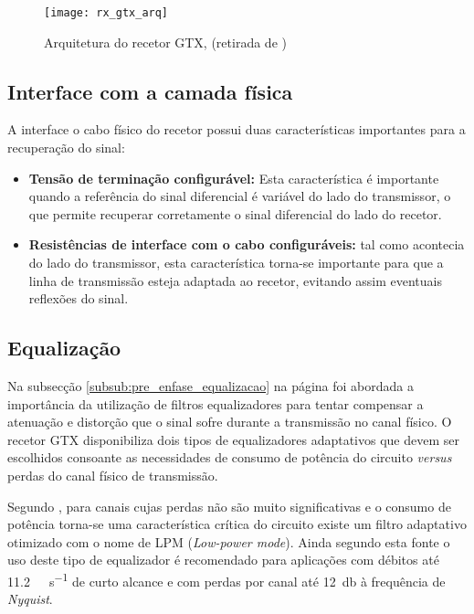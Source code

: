 \begin{figure}[h!]
	\begin{center}
		\leavevmode
		\texttt{[image: rx\_gtx\_arq]}
		\centering
		\caption[Arquitetura do recetor GTX]{Arquitetura do recetor GTX, (retirada de \cite{R011})}
		\label{fig:gtx_rx_arq}
	\end{center}
\end{figure}
	

\subsection{Interface com a camada física}

A interface o cabo físico do recetor possui duas características importantes para a recuperação do sinal:
\begin{itemize}
	\item \textbf{Tensão de terminação configurável:} Esta característica é importante quando a referência do sinal diferencial é variável do lado do transmissor, o que permite recuperar corretamente o sinal diferencial do lado do recetor.
	
	\item \textbf{Resistências de interface com o cabo configuráveis:} tal como acontecia do lado do transmissor, esta característica torna-se importante para que a linha de transmissão esteja adaptada ao recetor, evitando assim eventuais reflexões do sinal.
\end{itemize}


\subsection{Equalização} \label{subsub:rx_equalização}

Na subsecção \ref{subsub:pre_enfase_equalizacao} na página \pageref{subsub:pre_enfase_equalizacao} foi abordada a importância da utilização de filtros equalizadores para tentar compensar a atenuação e distorção que o sinal sofre durante a transmissão no canal físico. O recetor GTX disponibiliza dois tipos de equalizadores adaptativos que devem ser escolhidos consoante as necessidades de consumo de potência do circuito \textit{versus} perdas do canal físico de transmissão.

Segundo \cite{R011}, para canais cujas perdas não são muito significativas e o consumo de potência torna-se uma característica crítica do circuito existe um filtro adaptativo otimizado com o nome de LPM (\textit{Low-power mode}). Ainda segundo esta fonte o uso deste tipo de equalizador é recomendado para aplicações com débitos até \SI{11.2}{\giga\bit\per\second} de curto alcance e com perdas por canal até \SI{12}{\decibel} à frequência de \textit{Nyquist}.


